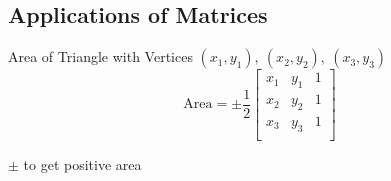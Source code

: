 \documentclass[12pt]{article}
\numberwithin{equation}{subsection}
\begin{document}
\begin{flushleft}
\subsection{Applications of Matrices}


Area of Triangle with Vertices $(x_{1},y_{1}), \ (x_{2},y_{2}), \ (x_{3},y_{3})$
\begin{equation}
\textrm{Area}= \pm \frac{1}{2}
\begin{bmatrix}
x_{1} & y_{1} & 1 \\
x_{2} & y_{2} & 1 \\
x_{3} & y_{3} & 1\\
\end{bmatrix}
\end{equation} 
\end{flushleft}
\begin{center}
$\pm$ to get positive area
\end{center}
\end{document}
